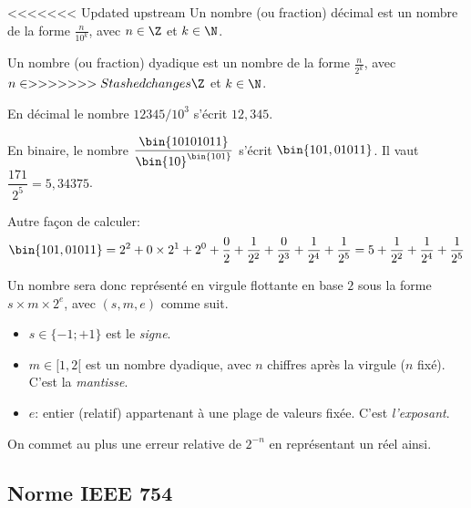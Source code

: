 \begin{defi}{}
<<<<<<< Updated upstream
 Un nombre (ou fraction) décimal est un nombre de la forme $\displaystyle\frac{n}{10^k}$, avec $n\in \Z$ et $k\in \N$.
\end{defi}


\begin{defi}{}
Un nombre (ou fraction) dyadique est un nombre de la forme $\displaystyle{}$, avec $n\in
>>>>>>> Stashed changes
    \Z$ et $k\in \N$.
\end{defi}
\begin{exemple}
En décimal le nombre $12345 / 10^{3}$ s'écrit $12,345$.
\end{exemple}
\begin{exemple}
En binaire, le nombre $$ s'écrit
$$. Il vaut $= 5,34375$.

Autre façon de calculer:
\begin{equation*}
  \bin{101,01011} =2^2+ 0\times 2^1+2^0 + \dfrac{0}{2} + \dfrac{1}{2^2} + \dfrac{0}{2^3} + \dfrac{1}{2^4} + \dfrac{1}{2^5}= 5 + \frac{1}{2^{2}} + \frac{1}{2^{4}}
  +\frac{1}{2^{5}}
\end{equation*}
\end{exemple}

Un nombre sera donc représenté en virgule flottante en base $2$ sous la forme $s\times m ^{e}$, avec $(s,m,e)$ comme suit.
\begin{itemize}
\item[\textbullet] $s\in\{-1;+1\}$ est le \emph{signe}.
\item[\textbullet] $m\in [1,2[$ est un nombre dyadique, avec $n$ chiffres après la virgule ($n$ fixé). C'est la \emph{mantisse}.
\item[\textbullet] $e$: entier (relatif) appartenant à une plage de valeurs fixée. C'est \emph{l'exposant}.
\end{itemize}

On commet au plus une erreur relative de $2^{-n}$ en représentant un réel ainsi. 


\subsection{Norme IEEE 754}

